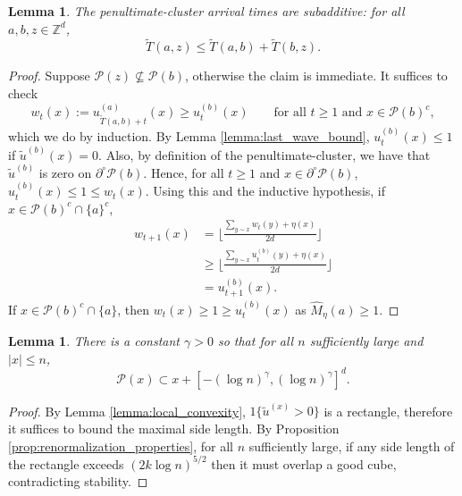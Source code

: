 \documentclass[aap]{imsart}
\newcommand{\Z}{\mathbb{Z}}
\newtheorem{lemma}[theorem]{Lemma}
\begin{document}
\begin{lemma} \label{lemma:approx_subadditivity}
	The penultimate-cluster arrival times are subadditive: for all $a,b,z \in \Z^d$, 
	\[
	\tilde{T}(a,z) \leq \tilde{T}(a,b) + \tilde{T}(b, z).
	\]	
\end{lemma}
\begin{proof}
	Suppose $\mathcal{P}(z) \not \subseteq \mathcal{P}(b)$, otherwise the claim is immediate.
	It suffices to check  
	\begin{equation}
	w_t(x)  := u_{\tilde{T}(a,b)+t}^{(a)}(x) \geq u_{t}^{(b)}(x) \qquad \mbox{for all $t \geq 1$ and $x \in \mathcal{P}(b)^c$},
	\end{equation}
	which we do by induction. 
	By Lemma \ref{lemma:last_wave_bound}, $u_t^{(b)}(x) \leq 1$ if $\tilde{u}^{(b)}(x) = 0$. 
	Also, by definition of the penultimate-cluster, we have that $\tilde u^{(b)}$  is zero 
	on $\partial^{\circ} \mathcal{P}(b)$.
	 Hence, for all $t \geq 1$ and $x \in \partial^{\circ} \mathcal{P}(b)$,  $u_t^{(b)}(x) \leq 1 \leq w_t(x)$.
	 Using this and the inductive hypothesis, if $x \in \mathcal{P}(b)^c \cap \{a\}^c$, 
	\begin{align*}
	w_{t+1}(x) &= \lfloor \frac{ \sum_{y \sim x} w_t(y) + \eta(x) }{ 2d} \rfloor \\
	&\geq  \lfloor \frac{ \sum_{y \sim x} u_{t}^{(b)}(y) + \eta(x) }{ 2d} \rfloor \\
	&=  u_{t+1}^{(b)}(x).
	\end{align*}
	If $x \in \mathcal{P}(b)^c \cap \{a\}$, then $w_t(x) \geq 1 \geq u_t^{(b)}(x)$ as $\hat{M}_{\eta}(a) \geq 1$. 
	
	
	
	
\end{proof}



\begin{lemma} \label{lemma:last_penultimate_cluster}
	There is a constant $\gamma > 0$ so that for all $n$ sufficiently large 
	and $|x| \leq n$, 
	\[
	\mathcal{P}(x) \subset x + [-(\log n)^{\gamma}, (\log n)^{\gamma}]^d.
	\]	
\end{lemma}
\begin{proof}
	By Lemma \ref{lemma:local_convexity}, $1\{ \tilde{u}^{(x)} > 0 \}$ is a rectangle,
	therefore it suffices to bound the maximal side length. By Proposition \ref{prop:renormalization_properties},
	for all $n$ sufficiently large, if any side length of the rectangle exceeds  $(2 k \log n)^{5/2}$ then it
	must overlap a good cube, contradicting stability. 
\end{proof}
\end{document}
